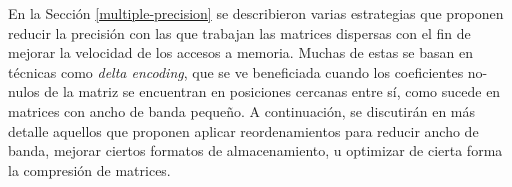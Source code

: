 

En la Sección \ref{multiple-precision} se describieron varias estrategias que proponen reducir la precisión con las que trabajan las matrices dispersas con el fin de mejorar la velocidad de los accesos a memoria. Muchas de estas se basan en técnicas como \textit{delta encoding}, que se ve beneficiada cuando los coeficientes no-nulos de la matriz se encuentran en posiciones cercanas entre sí, como sucede en matrices con ancho de banda pequeño. A continuación, se discutirán en más detalle aquellos que proponen aplicar reordenamientos para reducir ancho de banda, mejorar ciertos formatos de almacenamiento, u optimizar de cierta forma la compresión de matrices.


